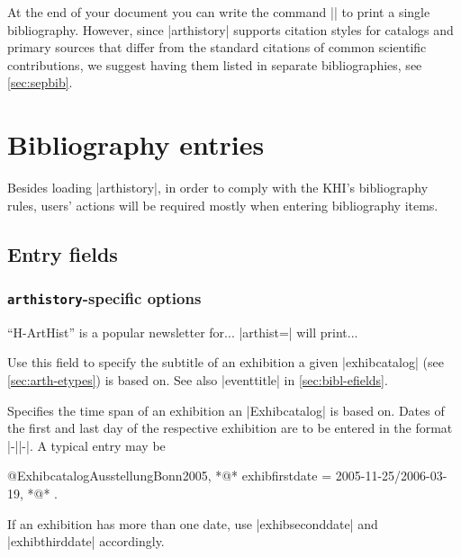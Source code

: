 \documentclass[a4paper,
10pt,
ngerman,
english
]{ltxdoc}
\begin{document}
At the end of your document you can write the command |\printbibliography| to print 
a single bibliography.
However, since |arthistory| supports citation styles for catalogs and primary sources that differ from the standard citations of common scientific contributions, we suggest having them listed in separate bibliographies, see \cref{sec:sepbib}.



\section{Bibliography entries}
Besides loading |arthistory|, in order to comply with the KHI's bibliography rules, users' actions will be required mostly when entering bibliography items.

\subsection{Entry fields}

\subsubsection{\texttt{arthistory}-specific options}

\enquote{H-ArtHist} is a popular newsletter for... %
|arthist=| will print...

Use this field to specify the subtitle of an exhibition a given |exhibcatalog| (see \cref{sec:arth-etypes}) is based on. See also |eventtitle| in \cref{sec:bibl-efields}.

Specifies the time span of an exhibition an |Exhibcatalog| is based on. Dates of the first and last day of the respective exhibition are to be entered in the format |-||-|. A typical entry may be
\begin{code}
@Exhibcatalog{AusstellungBonn2005,
  *@\ldots@*
  exhibfirstdate = {2005-11-25/2006-03-19},
  *@\ldots@*
}.
\end{code}
If an exhibition has more than one date, use |exhibseconddate| and |exhibthirddate| accordingly.
\end{document}
